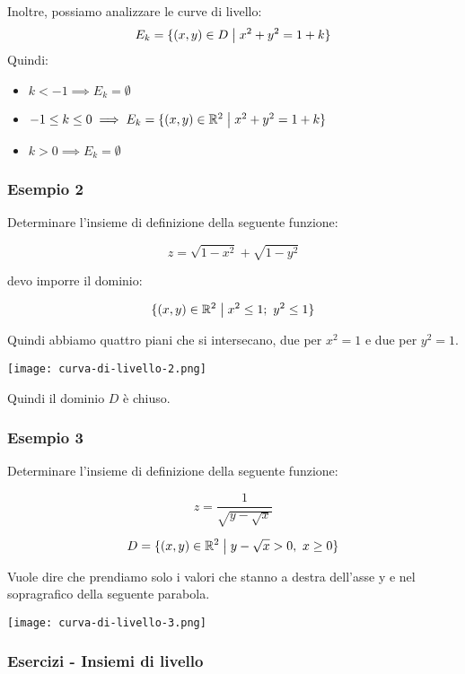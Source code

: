 Inoltre, possiamo analizzare le curve di livello:
\[
    E_k = \{(x,y) \in D \;\big|\; x^2+y^2=1+k\}
\]
Quindi:
\begin{itemize}
    \item \(k<-1 \implies E_k = \emptyset \)
    \item \(-1\le k \le 0 \implies E_k = \{(x,y)\in \mathbb{R}^{2} \;\big|\; x^2+y^2=1+k\} \)
    \item \(k>0 \implies E_k = \emptyset \)
\end{itemize}

\filbreak{}
\subsubsection*{Esempio 2}

Determinare l'insieme di definizione della seguente funzione:

\[
    z = \sqrt{1-x^{2}}+\sqrt{1-y^{2}}
\]

devo imporre il dominio:

\[
    \{(x,y) \in \mathbb{R}^{2} \;\big|\; x^{2}\le 1;\ y^{2}\le 1\}
\]

Quindi abbiamo quattro piani che si intersecano, due per \(x^2=1\) e due per \(y^2=1\).

\begin{center}
    \texttt{[image: curva-di-livello-2.png]}
\end{center}

Quindi il dominio \(D\) è chiuso.

\pagebreak
\subsubsection*{Esempio 3}

Determinare l'insieme di definizione della seguente funzione:

\[
    z = \frac{1}{\sqrt{y-\sqrt{x}}}
\]

\[
    D=\{(x,y) \in \mathbb{R}^{2} \;\big|\; y-\sqrt{x}>0,\ x \ge 0\}
\]

Vuole dire che prendiamo solo i valori che stanno a destra dell'asse y e nel sopragrafico della seguente parabola.

\begin{center}
    \texttt{[image: curva-di-livello-3.png]}
\end{center}

\pagebreak
\subsubsection{Esercizi {-} Insiemi di livello}

